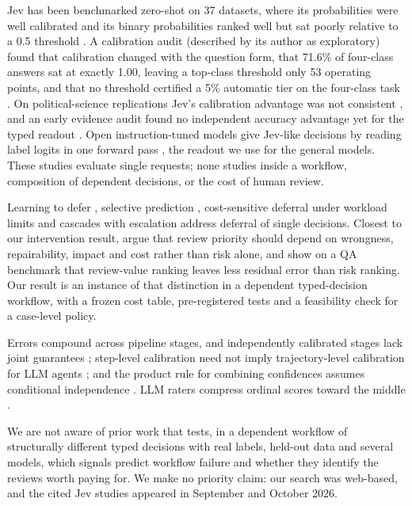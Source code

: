  Jev has been
benchmarked zero-shot on 37 datasets, where its \choice{} probabilities
were well calibrated and its binary probabilities ranked well but sat
poorly relative to a 0.5 threshold \citep{deusser2026jev}. A calibration
audit (described by its author as exploratory) found that calibration
changed with the question form, that 71.6\% of four-class answers sat at
exactly 1.00, leaving a top-class threshold only 53 operating points, and
that no threshold certified a 5\% automatic tier on the four-class task
\citep{meng2026jevaudit}. On political-science replications Jev's
calibration advantage was not consistent \citep{denney2026jev}, and an
early evidence audit found no independent accuracy advantage yet for the
typed readout \citep{tang2026typed}. Open instruction-tuned models give
Jev-like decisions by reading label logits in one forward pass
\citep{geuter2026innerjev}, the readout we use for the general models.
These studies evaluate single requests; none studies \score{} inside a
workflow, composition of dependent decisions, or the cost of human review.

 Learning to defer
\citep{madras2018predict}, selective prediction
\citep{geifman2017selective}, cost-sensitive deferral under workload
limits \citep{alves2024defer} and cascades with escalation
\citep{jung2025trust,bouchard2026escalation} address deferral of single
decisions. Closest to our intervention result, \citet{park2026riskreview}
argue that review priority should depend on wrongness, repairability,
impact and cost rather than risk alone, and show on a QA benchmark that
review-value ranking leaves less residual error than risk ranking. Our
result is an instance of that distinction in a dependent typed-decision
workflow, with a frozen cost table, pre-registered tests and a
feasibility check for a case-level policy.

 Errors compound across pipeline
stages, and independently calibrated stages lack joint guarantees
\citep{kotte2026pasc,chowdhury2019error}; step-level calibration need not
imply trajectory-level calibration for LLM agents \citep{lin2026uqagents};
and the product rule for combining confidences assumes conditional
independence \citep{kittler1998combining}. LLM raters compress ordinal
scores toward the middle \citep{zhang2026centraltendency}.

 We are not aware of prior work that tests, in a
dependent workflow of structurally different typed decisions with real
labels, held-out data and several models, which signals predict workflow
failure and whether they identify the reviews worth paying for. We make
no priority claim: our search was web-based, and the cited Jev studies
appeared in September and October 2026.

